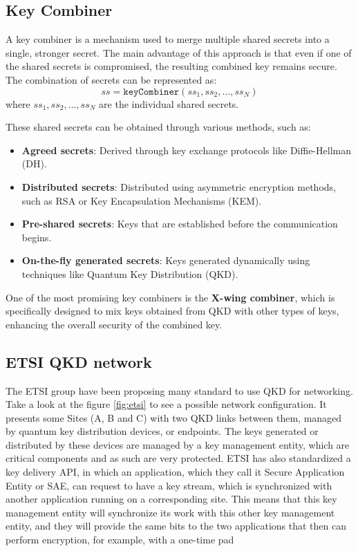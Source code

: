 \subsection{Key Combiner}

A key combiner is a mechanism used to merge multiple shared secrets
into a single, stronger secret. The main advantage of this approach is
that even if one of the shared secrets is compromised, the resulting
combined key remains secure. The combination of secrets can be
represented as:
\[
ss = \texttt{keyCombiner}(ss_1, ss_2, \ldots, ss_N)
\]
where \(ss_1, ss_2, \ldots, ss_N\) are the individual shared secrets.

These shared secrets can be obtained through various methods, such as:
\begin{itemize}
    \item \textbf{Agreed secrets}: Derived through key exchange
      protocols like Diffie-Hellman (DH).
    \item \textbf{Distributed secrets}: Distributed using asymmetric
      encryption methods, such as RSA or Key Encapsulation Mechanisms
      (KEM).
    \item \textbf{Pre-shared secrets}: Keys that are established
      before the communication begins.
    \item \textbf{On-the-fly generated secrets}: Keys generated
      dynamically using techniques like Quantum Key Distribution
      (QKD).
\end{itemize}

One of the most promising key combiners is the \textbf{X-wing
combiner}, which is specifically designed to mix keys obtained from
QKD with other types of keys, enhancing the overall security of the
combined key.

\subsection{ETSI QKD network}
The ETSI group have been proposing many standard to use QKD for
networking. Take a look at the figure \ref{fig:etsi} to see a possible
network configuration. It presents some Sites (A, B and C) with two
QKD links between them, managed by quantum key distribution devices,
or endpoints. The keys generated or distributed by these devices are
managed by a key management entity, which are critical components and
as such are very protected. ETSI has also standardized a key delivery
API, in which an application, which they call it Secure Application
Entity or SAE, can request to have a key stream, which is synchronized
with another application running on a corresponding site. This
means that this key management entity will synchronize its work with
this other key management entity, and they will provide the same bits
to the two applications that then can perform encryption, for example,
with a one-time pad

